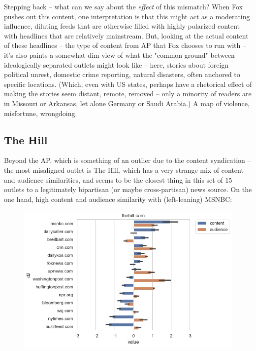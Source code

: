 \documentclass{scrartcl}
\begin{document}
Stepping back -- what can we say about the \textit{effect} of this mismatch? When Fox pushes out this content, one interpretation is that this might act as a moderating influence, diluting feeds that are otherwise filled with highly polarized content with headlines that are relatively mainstream. But, looking at the actual content of these headlines -- the type of content from AP that Fox chooses to run with -- it's also paints a somewhat dim view of what the "common ground" between ideologically separated outlets might look like -- here, stories about foreign political unrest, domestic crime reporting, natural disasters, often anchored to specific locations. (Which, even with US states, perhaps have a rhetorical effect of making the stories seem distant, remote, removed -- only a minority of readers are in Missouri or Arkansas, let alone Germany or Saudi Arabia.) A map of violence, misfortune, wrongdoing.

\subsection{The Hill}

Beyond the AP, which is something of an outlier due to the content syndication -- the most misaligned outlet is The Hill, which has a very strange mix of content and audience similarities, and seems to be the closest thing in this set of 15 outlets to a legitimately bipartisan (or maybe cross-partisan) news source. On the one hand, high content and audience similarity with (left-leaning) MSNBC:

\begin{figure}[H]
  \centering
  \includegraphics[width=\textwidth]{figures/ca-thehill-composite.png}
\end{figure}
\end{document}
